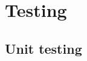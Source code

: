 \documentclass[../ITD.tex]{subfiles}
\begin{document}
    \chapter{Testing}\label{ch:testing}
    \section{Unit testing}\label{sec:unit-testing}
\end{document}
